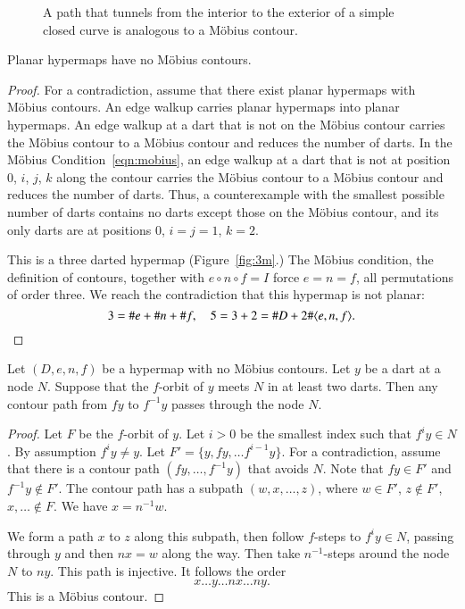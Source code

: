\begin{figure}[htb]
  \centering
  \caption{A path that tunnels from the interior to the exterior
   of a simple closed curve
   is analogous to a M\"obius contour.}
  \label{fig:violate-jct}
\end{figure}






\begin{lemma}  
Planar hypermaps have no M\"obius contours.
\end{lemma}

\begin{proof} For a contradiction, assume that there exist planar
hypermaps with M\"obius contours.  An edge walkup carries
planar hypermaps into planar hypermaps. An edge walkup
at a dart that is not on the M\"obius contour carries the
M\"obius contour to a M\"obius contour 
and reduces the number of darts.  
In the M\"obius Condition~\ref{eqn:mobius},
an edge walkup at a dart that is not at position $0$, $i$, $j$, $k$
along the contour carries the M\"obius contour to a M\"obius contour
and reduces the number of darts. Thus, a counterexample with
the smallest possible number of darts contains no
darts except those on the M\"obius contour, and its only darts
are at positions $0$, $i=j=1$, $k=2$.

This is a three darted hypermap (Figure~\ref{fig:3m}.)  
The M\"obius condition, the
definition of contours, together with $e\circ n\circ f=I$ force
$e=n=f$, all permutations of order three. We reach the contradiction
that this hypermap is not planar:
    $$3 = \# e + \# n + \# f,\quad 5 = 3+2 = \# D + 2 \#\langle e,n,f\rangle.$$
\end{proof}


\begin{lemma}  
Let $(D,e,n,f)$ be a hypermap with no M\"obius contours.
Let $y$ be a dart at a node $N$.
Suppose that the $f$-orbit of $y$ meets $N$ in
at least two darts.  Then any contour path from $f y$
to $f^{-1} y$ passes through the node $N$. 
\end{lemma}

\begin{proof} Let $F$ be the $f$-orbit of $y$.
Let $i>0$ be the smallest index such that $f^i y\in N$.
By assumption $f^i y \ne y$.
Let $F' = \{y,f y,\ldots f^{i-1} y\}$.
For a contradiction, assume that there is
a contour path  $(f y,\ldots,f^{-1} y)$ that avoids $N$.
Note that $f y\in F'$ and $f^{-1} y\not\in F'$.
%
The contour path has a subpath $(w,x,\ldots,z)$, where
$w\in F'$, $z\not\in F'$,  $x,\ldots\not\in F$.  
We have $x=n^{-1}w$.

We form a path $x$ to $z$ along this subpath, then
follow $f$-steps to $f^i y\in N$, passing through $y$ and
then $n x = w$ along the way.
Then take $n^{-1}$-steps around the node $N$ to $n y$.  This
path is injective.  It follows the order
   $$
   x\ldots y\ldots n x\ldots n y.
   $$
This is a M\"obius contour.
\end{proof}


